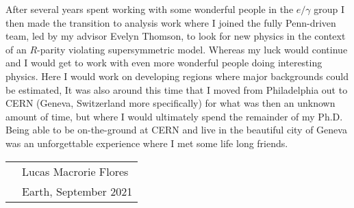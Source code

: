 After several years spent working with some wonderful people in the $e/\gamma$ group I then made the transition to analysis work where I joined the fully Penn-driven team, led by my advisor Evelyn Thomson, to look for new physics in the context of an $R$-parity violating supersymmetric model.
Whereas my luck would continue and I would get to work with even more wonderful people doing interesting physics.
Here I would work on developing regions where major backgrounds could be estimated, 
It was also around this time that I moved from Philadelphia out to CERN (Geneva, Switzerland more specifically) for what was then an unknown amount of time, but where I would ultimately spend the remainder of my Ph.D.
Being able to be on-the-ground at CERN and live in the beautiful city of Geneva was an unforgettable experience where I met some life long friends.


\vspace{0.05\textheight}

\begin{tabular}{p{} l}
  & Lucas Macrorie Flores             \\
  & Earth, September 2021  \\
\end{tabular}

